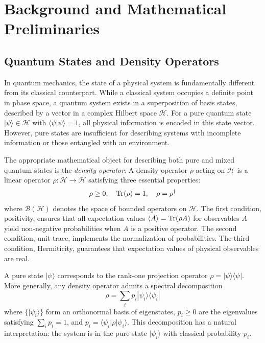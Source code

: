 \documentclass[12pt,a4paper]{article}
\newcommand{\cH}{\mathcal{H}}
\newcommand{\cB}{\mathcal{B}}
\begin{document}
\section{Background and Mathematical Preliminaries}

\subsection{Quantum States and Density Operators}

In quantum mechanics, the state of a physical system is fundamentally different from its classical counterpart. While a classical system occupies a definite point in phase space, a quantum system exists in a superposition of basis states, described by a vector in a complex Hilbert space $\cH$. For a pure quantum state $|\psi\rangle \in \cH$ with $\langle\psi|\psi\rangle = 1$, all physical information is encoded in this state vector. However, pure states are insufficient for describing systems with incomplete information or those entangled with an environment.

The appropriate mathematical object for describing both pure and mixed quantum states is the \emph{density operator}. A density operator $\rho$ acting on $\cH$ is a linear operator $\rho: \cH \to \cH$ satisfying three essential properties:
\begin{equation}
\rho \geq 0, \quad \Tr(\rho) = 1, \quad \rho = \rho^\dagger
\end{equation}
where $\cB(\cH)$ denotes the space of bounded operators on $\cH$. The first condition, positivity, ensures that all expectation values $\langle A \rangle = \Tr(\rho A)$ for observables $A$ yield non-negative probabilities when $A$ is a positive operator. The second condition, unit trace, implements the normalization of probabilities. The third condition, Hermiticity, guarantees that expectation values of physical observables are real.

A pure state $|\psi\rangle$ corresponds to the rank-one projection operator $\rho = |\psi\rangle\langle\psi|$. More generally, any density operator admits a spectral decomposition
\begin{equation}
\rho = \sum_{i} p_i |\psi_i\rangle\langle\psi_i|
\end{equation}
where $\{|\psi_i\rangle\}$ form an orthonormal basis of eigenstates, $p_i \geq 0$ are the eigenvalues satisfying $\sum_i p_i = 1$, and $p_i = \langle\psi_i|\rho|\psi_i\rangle$. This decomposition has a natural interpretation: the system is in the pure state $|\psi_i\rangle$ with classical probability $p_i$.
\end{document}
